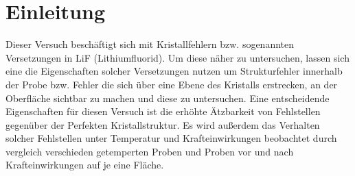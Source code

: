 ﻿\section{Einleitung}
Dieser Versuch beschäftigt sich mit Kristallfehlern bzw. sogenannten Versetzungen in LiF (Lithiumfluorid). Um diese
näher zu untersuchen, lassen sich eine die Eigenschaften solcher Versetzungen nutzen um Strukturfehler innerhalb der Probe
bzw. Fehler die sich über eine Ebene des Kristalls erstrecken, an der Oberfläche sichtbar zu machen und diese zu untersuchen.
Eine entscheidende Eigenschaften für diesen Versuch ist die erhöhte Ätzbarkeit von Fehlstellen gegenüber der Perfekten Kristallstruktur.
Es wird außerdem das Verhalten solcher Fehlstellen unter Temperatur und Krafteinwirkungen beobachtet durch vergleich verschieden getemperten Proben
und Proben vor und nach Krafteinwirkungen auf je eine Fläche.
